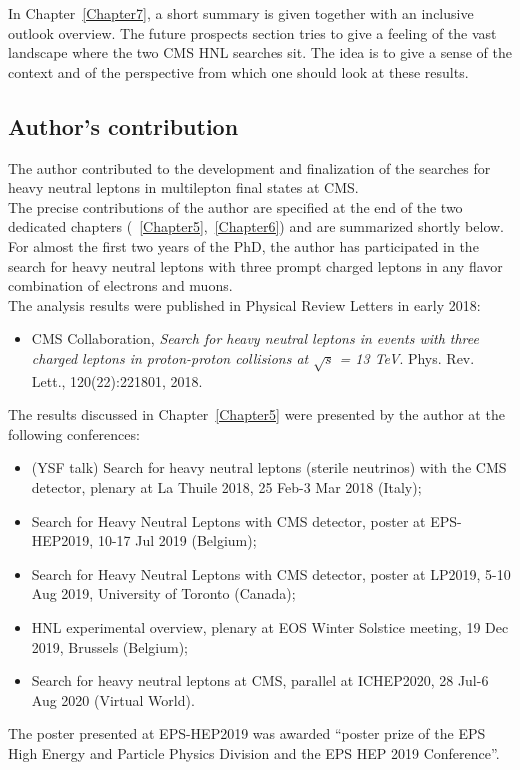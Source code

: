 In Chapter~\ref{Chapter7}, a short summary is given together with an
inclusive outlook overview. The future prospects section tries to give a feeling of the vast landscape
where the two CMS HNL searches sit. The idea is to give a sense of the
context and of the perspective from which one should look at these results.

\subsection*{Author's contribution}

The author contributed to the development and finalization of the
searches for heavy neutral leptons in multilepton final
states at CMS.\\
The precise contributions of the author are specified at
the end of the two dedicated chapters
(~\ref{Chapter5},~\ref{Chapter6}) 
and are summarized shortly below.\\

For almost the first two years of the PhD, the author
has participated in the search for heavy neutral leptons with three
prompt charged leptons in any flavor combination of electrons and
muons. \\
The analysis
results were published in Physical Review Letters in early 2018:
\begin{itemize}
\setlength\itemsep{-0.1em}
\item CMS Collaboration, \emph{Search for heavy neutral leptons in events with three charged leptons
in proton-proton collisions at $\sqrt{s}$ = 13 TeV}. Phys. Rev. Lett., 120(22):221801, 2018.
\end{itemize}

The results discussed in Chapter~\ref{Chapter5} were presented by the author at the following
conferences:
\begin{itemize}
\setlength\itemsep{-0.1em}
\item (YSF talk) Search for heavy neutral leptons (sterile
  neutrinos) with the CMS detector, plenary at La Thuile 2018, 25
  Feb-3 Mar 2018 (Italy);
\item Search for Heavy Neutral Leptons with CMS detector, poster at
  EPS-HEP2019, 10-17 Jul 2019 (Belgium);
\item Search for Heavy Neutral Leptons with CMS detector, poster at
  LP2019, 5-10 Aug 2019, University of Toronto (Canada);
\item HNL experimental overview, plenary at EOS Winter Solstice
  meeting, 19 Dec 2019, Brussels (Belgium);
\item  Search for heavy neutral leptons at CMS, parallel at
  ICHEP2020, 28 Jul-6 Aug 2020 (Virtual World).
\end{itemize}
The poster presented at EPS-HEP2019 was awarded ``poster prize of
the EPS High Energy and Particle Physics Division and the EPS HEP 2019
Conference''.\\
 
